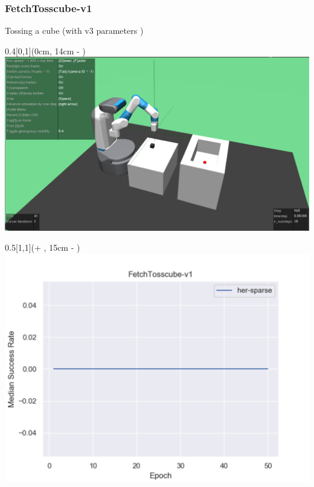 \begin{frame}
	\frametitle{FetchTosscube-v1}	
	\vspace{1cm}
	
	Tossing a cube (with v3 parameters )
	
	\begin{textblock*}{0.4\paperwidth}[0,1](0cm, 14cm - \PraesentationSeitenrand)%
		\includegraphics[width=0.4\paperwidth]{./Ressourcen/Figures/FetchTosscube-v1.pdf}
	\end{textblock*}
	
	\begin{textblock*}{0.5\paperwidth}[1,1](\textwidth + \PraesentationSeitenrand, 15cm - \PraesentationSeitenrand)%
	    \includegraphics[width=0.5\paperwidth]{./Ressourcen/Figures/fig_FetchTosscube-v1.pdf}
	\end{textblock*}
	
\end{frame}
\clearpage


